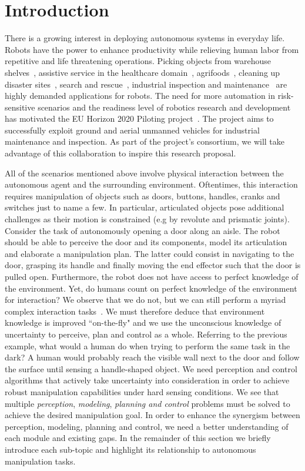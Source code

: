 \section{Introduction}
\label{sec:Introduction}

There is a growing interest in deploying autonomous systems in everyday life. Robots have the power to enhance productivity while relieving human labor from repetitive and life threatening operations. Picking objects from warehouse shelves~\cite{correll2016analysis}, assistive service in the healthcare domain~\cite{cooper2020ari}, agrifoods~\cite{duckett2018agricultural}, cleaning up disaster sites~\cite{nishikawa2019disaster}, search and rescue~\cite{negrello2018walk}, industrial inspection and maintenance~\cite{lattanzi2017review} are highly demanded applications for robots. The need for more automation in risk-sensitive scenarios and the readiness level of robotics research and development has motivated the EU Horizon 2020 Piloting project~\cite{eu-piloting-2020}. The project aims to successfully exploit ground and aerial unmanned vehicles for industrial maintenance and inspection. As part of the project's consortium, we will take advantage of this collaboration to inspire this research proposal.     

\medskip
All of the scenarios mentioned above involve physical interaction between the autonomous agent and the surrounding environment. Oftentimes, this interaction requires manipulation of objects such as doors, buttons, handles, cranks and switches just to name a few. In particular, articulated objects pose additional challenges as their motion is constrained (e.g by revolute and prismatic joints). Consider the task of autonomously opening a door along an aisle. The robot should be able to perceive the door and its components, model its articulation and elaborate a manipulation plan. The latter could consist in navigating to the door, grasping its handle and finally moving the end effector such that the door is pulled open. Furthermore, the robot does not have access to perfect knowledge of the environment. Yet, do humans count on perfect knowledge of the environment for interaction? We observe that we do not, but we can still perform a myriad complex interaction tasks~\cite{denison2018humans}. We must therefore deduce that environment knowledge is improved ``on-the-fly" and we use the unconscious knowledge of uncertainty to perceive, plan and control as a whole. Referring to the previous example, what would a human do when trying to perform the same task in the dark? A human would probably reach the visible wall next to the door and follow the surface until sensing a handle-shaped object. We need perception and control algorithms that actively take uncertainty into consideration in order to achieve robust manipulation capabilities under hard sensing conditions.   
We see that multiple \emph{perception}, \emph{modeling}, \emph{planning and control} problems must be solved to achieve the desired manipulation goal. In order to enhance the synergism between perception, modeling, planning and control, we need a better understanding of each module and existing gaps. In the remainder of this section we briefly introduce each sub-topic and highlight its relationship to autonomous manipulation tasks. 


